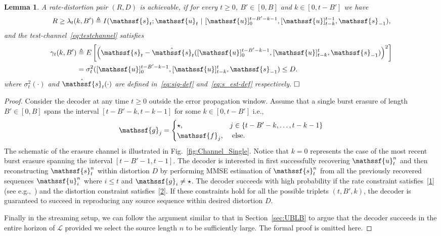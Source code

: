 \documentclass[journal, twocolumn, 10pt]{IEEEtran}
\newtheorem{lemma}{Lemma}
\newcommand{\cL}{{\mathcal{L}}}
\newcommand{\rvf}{{\mathssf{f}}}    %
\newcommand{\rvg}{{\mathssf{g}}}    %
\newcommand{\rvs}{{\mathssf{s}}}    %
\newcommand{\rvu}{{\mathssf{u}}}    %
\begin{document}
\begin{lemma}
\label{lem:New}
A rate-distortion pair $(R,D)$ is achievable, if for every $t\ge0$, $B'\in[0,B]$ and $k \in[0,t-B']$  we have 
\begin{align}
R  \ge \lambda_t(k,B') \triangleq I(\rvs_{t}; \rvu_{t}~|~[\rvu]_{0}^{t-B'-k-1}, [\rvu]_{t-k}^{t-1}, \rvs_{-1})  \label{1},
\end{align} and the test-channel~\eqref{eq:testchannel} satisfies
\begin{align}
\gamma_t(k,B') &\triangleq E\left[ \left(\rvs_{t} - \hat{\rvs}_{t}([\rvu]_{0}^{t-B'-k-1}, [\rvu]_{t-k}^{t},\rvs_{-1}) \right)^2\right]\notag\\
& =  \sigma^2_{t}([\rvu]_{0}^{t-B'-k-1}, [\rvu]_{t-k}^{t},\rvs_{-1}) \le D  \label{2}.
\end{align}
where $\sigma^2_t(\cdot)$ and $\hat{\rvs}_t(\cdot)$ are defined in~\eqref{eq:sig-def} and~\eqref{eq:s_est-def} respectively.
$\hfill\Box$
\end{lemma}
\begin{proof} 
Consider the decoder at any time $t\ge 0$ outside the error propagation window. 
Assume that a single burst erasure of length $B'\in[0,B]$ spans the interval $[t-B'-k, t-k-1]$ for some $k \in [0,t-B']$ i.e., 
\begin{align}
\rvg_{j} =\begin{cases}
\star, &j\in\{t-B'-k, \ldots, t-k-1\} \\
\rvf_j, &\text{ else}.
\end{cases} \label{eq:EP}
\end{align} 
The schematic of the erasure channel is illustrated in Fig.~\ref{fig:Channel_Single}. Notice that $k=0$ represents the case of the most recent burst erasure spanning the interval $[t-B'-1, t-1]$. The decoder is interested in first successfully recovering $\rvu^n_{t}$ and then reconstructing $\rvs_{t}^n$ within distortion $D$ by performing MMSE estimation of $\rvs_{t}^n$ from all the previously recovered sequences $\rvu_{i}^{n}$ where $i\le t$ and $\rvg_{i} \neq \star$. The decoder succeeds with high probability if the rate constraint satisfies~\eqref{1} (see e.g.,~\cite{tavildar:10}) and the distortion constraint satisfies~\eqref{2}. If these constraints hold for all the possible triplets $(t,B',k)$, the decoder is guaranteed to succeed in reproducing any source sequence within desired distortion $D$. 

Finally in the streaming setup, we can follow the argument similar to that in Section~\ref{sec:UBLB} to argue that the decoder succeeds in the entire horizon of $\cL$  provided we select the source length $n$ to be sufficiently large.
The formal proof is omitted here. 
\end{proof}
\end{document}
